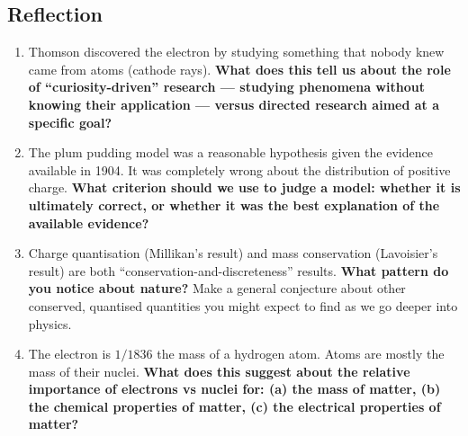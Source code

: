 \documentclass[12pt, a4paper]{book}
\theoremstyle{definition}
\begin{document}
\begin{deepbox}
\begin{enumerate}[label=\textbf{D\arabic*.}]
\end{enumerate}
\end{deepbox}

\subsection*{Reflection}

\begin{reflectionbox}
\begin{enumerate}[label=\textbf{R\arabic*.}]
  \item Thomson discovered the electron by studying something
        that nobody knew came from atoms (cathode rays).
        \textbf{What does this tell us about the role of
        ``curiosity-driven'' research ---
        studying phenomena without knowing their application ---
        versus directed research aimed at a specific goal?}

  \item The plum pudding model was a reasonable hypothesis
        given the evidence available in 1904.
        It was completely wrong about the distribution of
        positive charge.
        \textbf{What criterion should we use to judge a model:
        whether it is ultimately correct, or whether it was
        the best explanation of the available evidence?}

  \item Charge quantisation (Millikan's result) and mass
        conservation (Lavoisier's result) are both
        ``conservation-and-discreteness'' results.
        \textbf{What pattern do you notice about nature?}
        Make a general conjecture about other conserved,
        quantised quantities you might expect to find as
        we go deeper into physics.

  \item The electron is $1/1836$ the mass of a hydrogen atom.
        Atoms are mostly the mass of their nuclei.
        \textbf{What does this suggest about the relative
        importance of electrons vs nuclei for:
        (a) the mass of matter,
        (b) the chemical properties of matter,
        (c) the electrical properties of matter?}
\end{enumerate}
\end{reflectionbox}
\end{document}
